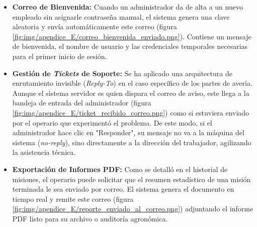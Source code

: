 \begin{itemize}
    \item \textbf{Correo de Bienvenida:} Cuando un administrador da de alta a un nuevo empleado sin asignarle contraseña manual, el sistema genera una clave aleatoria y envía automáticamente este correo (figura \ref{fig:img/apendice_E/correo_bienvenida_enviado.png}). Contiene un mensaje de bienvenida, el nombre de usuario y las credenciales temporales necesarias para el primer inicio de sesión.
    
    
    \item \textbf{Gestión de \textit{Tickets} de Soporte:} Se ha aplicado una arquitectura de enrutamiento invisible (\textit{Reply-To}) en el caso específico de los partes de avería. Aunque el sistema servidor es quien dispara el correo de aviso, este llega a la bandeja de entrada del administrador (figura \ref{fig:img/apendice_E/ticket_recibido_correo.png}) como si estuviera enviado por el operario que experimentó el problema. De este modo, si el administrador hace clic en "Responder", su mensaje no va a la máquina del sistema (\textit{no-reply}), sino directamente a la dirección del trabajador, agilizando la asistencia técnica.
    
    
    \item \textbf{Exportación de Informes PDF:} Como se detalló en el historial de misiones, el operario puede solicitar que el resumen estadístico de una misión terminada le sea enviado por correo. El sistema genera el documento en tiempo real y remite este correo (figura \ref{fig:img/apendice_E/reporte_enviado_al_correo.png}) adjuntando el informe PDF listo para su archivo o auditoría agronómica.
    
\end{itemize}
